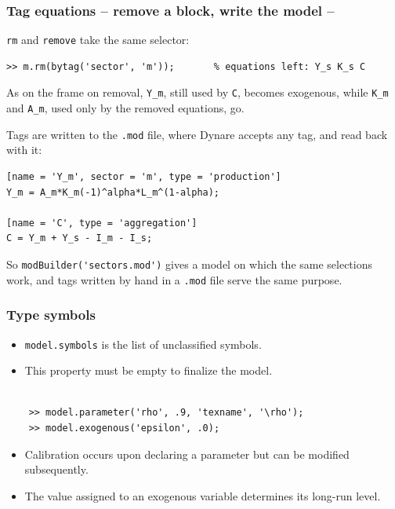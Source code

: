 \documentclass[10pt,slidestop]{beamer}
\theoremstyle{plain}
\begin{document}
\begin{frame}[fragile]
  \frametitle{Tag equations -- remove a block, write the model --}

  \verb+rm+ and \verb+remove+ take the same selector:

  \begin{lstlisting}[style=MatlabConsole,basicstyle=\ttfamily\scriptsize]
>> m.rm(bytag('sector', 'm'));       % equations left: Y_s K_s C
  \end{lstlisting}

  \small As on the frame on removal, \verb+Y_m+, still used by \verb+C+, becomes
  exogenous, while \verb+K_m+ and \verb+A_m+, used only by the removed equations, go.

  \medskip
  \normalsize Tags are written to the \verb+.mod+ file, where Dynare accepts any tag,
  and read back with it:

  \begin{lstlisting}[language=Dynare,basicstyle=\scriptsize\ttfamily,numbers=none]
[name = 'Y_m', sector = 'm', type = 'production']
Y_m = A_m*K_m(-1)^alpha*L_m^(1-alpha);

[name = 'C', type = 'aggregation']
C = Y_m + Y_s - I_m - I_s;
  \end{lstlisting}

  \small So \verb+modBuilder('sectors.mod')+ gives a model on which the same selections
  work, and tags written by hand in a \verb+.mod+ file serve the same purpose.

\end{frame}


\begin{frame}[c,fragile]
  \frametitle{Type symbols}

  \begin{itemize}

  \item \verb+model.symbols+ is the list of unclassified symbols.\newline

  \item This property must be empty to finalize the model.\newline

  \end{itemize}

  \begin{lstlisting}[style=MatlabConsole]

    >> model.parameter('rho', .9, 'texname', '\rho');
    >> model.exogenous('epsilon', .0);
   \end{lstlisting}

   \medskip

  \begin{itemize}

  \item Calibration occurs upon declaring a parameter but can be modified subsequently.\newline

  \item The value assigned to an exogenous variable determines its long-run level.

  \end{itemize}

\end{frame}
\end{document}
